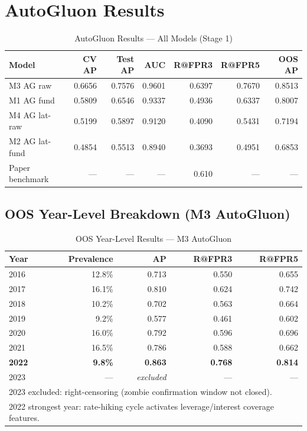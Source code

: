 \documentclass{report}\usepackage[]{graphicx}\usepackage[table]{xcolor}
\begin{document}
\section{AutoGluon Results}

\begin{table}[H]
\centering
\caption{AutoGluon Results — All Models (Stage 1)}
\begin{tabular}{lrrrrrr}
\toprule
\textbf{Model} & \textbf{CV AP} & \textbf{Test AP} & \textbf{AUC} & \textbf{R@FPR3} & \textbf{R@FPR5} & \textbf{OOS AP} \\
\midrule
M3 AG raw      & 0.6656 & 0.7576 & 0.9601 & 0.6397 & 0.7670 & 0.8513 \\
M1 AG fund     & 0.5809 & 0.6546 & 0.9337 & 0.4936 & 0.6337 & 0.8007 \\
M4 AG lat-raw  & 0.5199 & 0.5897 & 0.9120 & 0.4090 & 0.5431 & 0.7194 \\
M2 AG lat-fund & 0.4854 & 0.5513 & 0.8940 & 0.3693 & 0.4951 & 0.6853 \\
\midrule
Paper benchmark & — & — & — & 0.610 & — & — \\
\bottomrule
\end{tabular}
\end{table}

\subsection{OOS Year-Level Breakdown (M3 AutoGluon)}

\begin{table}[H]
\centering
\caption{OOS Year-Level Results — M3 AutoGluon}
\begin{tabular}{lrrrr}
\toprule
\textbf{Year} & \textbf{Prevalence} & \textbf{AP} & \textbf{R@FPR3} & \textbf{R@FPR5} \\
\midrule
2016 & 12.8\% & 0.713 & 0.550 & 0.655 \\
2017 & 16.1\% & 0.810 & 0.624 & 0.742 \\
2018 & 10.2\% & 0.702 & 0.563 & 0.664 \\
2019 & 9.2\%  & 0.577 & 0.461 & 0.602 \\
2020 & 16.0\% & 0.792 & 0.596 & 0.696 \\
2021 & 16.5\% & 0.786 & 0.588 & 0.662 \\
\textbf{2022} & \textbf{9.8\%} & \textbf{0.863} & \textbf{0.768} & \textbf{0.814} \\
2023 & — & \textit{excluded} & — & — \\
\bottomrule
\multicolumn{5}{l}{\scriptsize 2023 excluded: right-censoring (zombie confirmation window not closed).} \\
\multicolumn{5}{l}{\scriptsize 2022 strongest year: rate-hiking cycle activates leverage/interest coverage features.} \\
\end{tabular}
\end{table}
\end{document}
